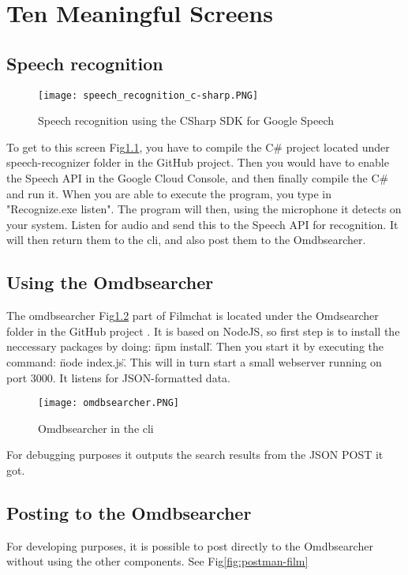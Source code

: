 \documentclass[11pt,fleqn]{book} %
\begin{document}

\chapter{Ten Meaningful Screens}
\section{Speech recognition}
\begin{figure}[]
  \centering
   \texttt{[image: speech\_recognition\_c-sharp.PNG]}
  \caption{Speech recognition using the CSharp SDK for Google Speech}
  \label{fig:c-sharp-speech}
\end{figure}
To get to this screen Fig\ref{fig:c-sharp-speech}, you have to compile the C\# project located under speech-recognizer folder in the GitHub project. \cite{Github2017GitHubProject}
Then you would have to enable the Speech API in the Google Cloud Console, and then finally compile the C\# and run it.
When you are able to execute the program, you type in "Recognize.exe listen". The program will then, using the microphone it detects on your system. Listen for audio and send this to the Speech API for recognition. It will then return them to the cli, and also post them to the Omdbsearcher.

\newpage
\section{Using the Omdbsearcher}
The omdbsearcher Fig\ref{fig:omdbsearcher} part of Filmchat is located under the Omdsearcher folder in the GitHub project \cite{Github2017GitHubProject}. It is based on NodeJS, so first step is to install the neccessary packages by doing: \"npm install\". Then you start it by executing the command: \"node index.js\". This will in turn start a small webserver running on port 3000.
It listens for JSON-formatted data.
\begin{figure}[]
  \centering
   \texttt{[image: omdbsearcher.PNG]}
  \caption{Omdbsearcher in the cli}
  \label{fig:omdbsearcher}
\end{figure}
For debugging purposes it outputs the search results from the JSON POST it got.

\newpage
\section{Posting to the Omdbsearcher}
For developing purposes, it is possible to post directly to the Omdbsearcher without using the other components. See Fig\ref{fig:postman-film}
\end{document}
